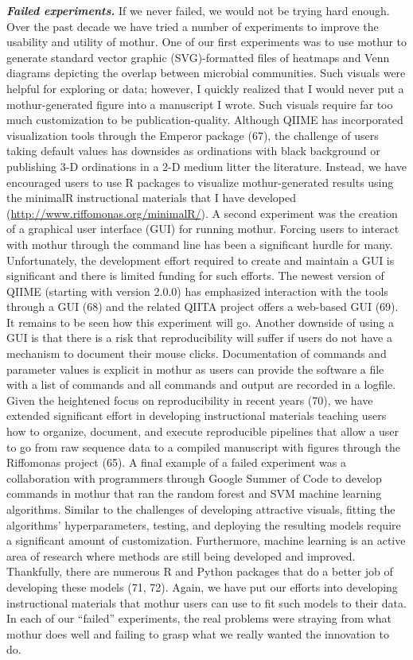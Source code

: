 \documentclass[11pt,]{article}
\begin{document}
\textbf{\emph{Failed experiments.}} If we never failed, we would not be
trying hard enough. Over the past decade we have tried a number of
experiments to improve the usability and utility of mothur. One of our
first experiments was to use mothur to generate standard vector graphic
(SVG)-formatted files of heatmaps and Venn diagrams depicting the
overlap between microbial communities. Such visuals were helpful for
exploring or data; however, I quickly realized that I would never put a
mothur-generated figure into a manuscript I wrote. Such visuals require
far too much customization to be publication-quality. Although QIIME has
incorporated visualization tools through the Emperor package (67), the
challenge of users taking default values has downsides as ordinations
with black background or publishing 3-D ordinations in a 2-D medium
litter the literature. Instead, we have encouraged users to use R
packages to visualize mothur-generated results using the minimalR
instructional materials that I have developed
(\url{http://www.riffomonas.org/minimalR/}). A second experiment was the
creation of a graphical user interface (GUI) for running mothur. Forcing
users to interact with mothur through the command line has been a
significant hurdle for many. Unfortunately, the development effort
required to create and maintain a GUI is significant and there is
limited funding for such efforts. The newest version of QIIME (starting
with version 2.0.0) has emphasized interaction with the tools through a
GUI (68) and the related QIITA project offers a web-based GUI (69). It
remains to be seen how this experiment will go. Another downside of
using a GUI is that there is a risk that reproducibility will suffer if
users do not have a mechanism to document their mouse clicks.
Documentation of commands and parameter values is explicit in mothur as
users can provide the software a file with a list of commands and all
commands and output are recorded in a logfile. Given the heightened
focus on reproducibility in recent years (70), we have extended
significant effort in developing instructional materials teaching users
how to organize, document, and execute reproducible pipelines that allow
a user to go from raw sequence data to a compiled manuscript with
figures through the Riffomonas project (65). A final example of a failed
experiment was a collaboration with programmers through Google Summer of
Code to develop commands in mothur that ran the random forest and SVM
machine learning algorithms. Similar to the challenges of developing
attractive visuals, fitting the algorithms' hyperparameters, testing,
and deploying the resulting models require a significant amount of
customization. Furthermore, machine learning is an active area of
research where methods are still being developed and improved.
Thankfully, there are numerous R and Python packages that do a better
job of developing these models (71, 72). Again, we have put our efforts
into developing instructional materials that mothur users can use to fit
such models to their data. In each of our ``failed'' experiments, the
real problems were straying from what mothur does well and failing to
grasp what we really wanted the innovation to do.
\end{document}
